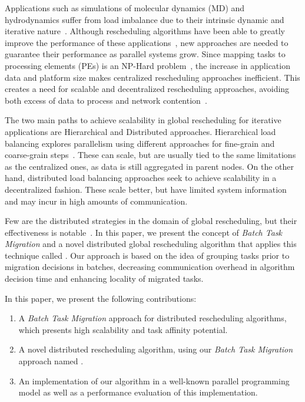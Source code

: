 Applications such as simulations of molecular dynamics (MD) and hydrodynamics suffer from load imbalance due to their intrinsic dynamic and iterative nature~\cite{namd,IPDPS13:LULESH}.
Although rescheduling algorithms have been able to greatly improve the performance of these applications~\cite{namd0}, new approaches are needed to guarantee their performance as parallel systems grow.
Since mapping tasks to processing elements (PEs) is an NP-Hard problem~\cite{npcomplete}, the increase in application data and platform size makes centralized rescheduling approaches inefficient.
This creates a need for scalable and decentralized rescheduling approaches, avoiding both excess of data to process and network contention~\cite{trahay2009scalable}.

The two main paths to achieve scalability in global rescheduling for iterative applications are Hierarchical and Distributed approaches.
Hierarchical load balancing explores parallelism using different approaches for fine-grain and coarse-grain steps~\cite{hybrid}.
These can scale, but are usually tied to the same limitations as the centralized ones, as data is still aggregated in parent nodes.
On the other hand, distributed load balancing approaches seek to achieve scalability in a decentralized fashion.
These scale better, but have limited system information and may incur in high amounts of communication.

Few are the distributed strategies in the domain of global rescheduling, but their effectiveness is notable~\cite{grapevine,diffus}.
In this paper, we present the concept of \textit{Batch Task Migration} and a novel distributed global rescheduling algorithm that applies this technique called \packdrop.
Our approach is based on the idea of grouping tasks prior to migration decisions in batches, decreasing communication overhead in algorithm decision time and enhancing locality of migrated tasks.

In this paper, we present the following contributions: 
\begin{enumerate}
	\item A \textit{Batch Task Migration} approach for distributed rescheduling algorithms, which presents high scalability and task affinity potential.
	\item A novel distributed rescheduling algorithm, using our \textit{Batch Task Migration} approach named \packdrop.
	\item An implementation of our algorithm in a well-known parallel programming model as well as a performance evaluation of this implementation.
\end{enumerate}

